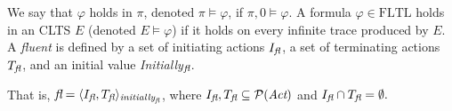 We say that $\varphi$ holds in $\pi$, denoted $\pi\models\varphi$, if $\pi,0\models\varphi$. 
A formula $\varphi \in \mbox{FLTL}$ holds in an CLTS $E$ (denoted $E \models \varphi$) if it holds on every infinite trace produced by $E$.
A \emph{fluent} \fluent \space is defined by a set of initiating actions $I_{\emph{fl}}$, a set of terminating actions $T_{\emph{fl}}$, and an initial value \emph{Initially}$_{\emph{fl}}$.

That is,
$ \emph{fl} = \langle I_{\emph{fl}}, T_{\emph{fl}} \rangle_{\emph{initially}_{\emph{fl}}} $, 
where 
$I_{\emph{fl}},T_{\emph{fl}} \subseteq \mathcal{P}(\emph{Act})$ 
and $I_{\emph{fl}} \cap T_{\emph{fl}} = \emptyset.$\\
